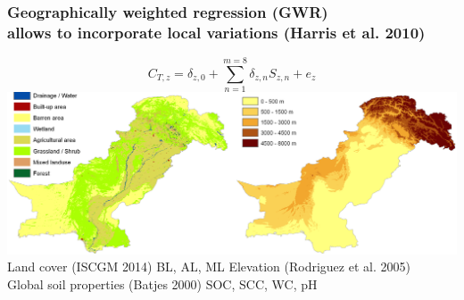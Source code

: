 \documentclass[10pt, compress]{beamer}
\begin{document}
\begin{frame}[fragile]
  \frametitle{Geographically weighted regression (GWR) \protect\\ allows to incorporate local variations \small (Harris et al. 2010)}

  \begin{equation*}
    C_{T,z} = \delta_{z,0} + \sum_{n=1}^{m=8}\delta_{z,n}S_{z,n} + e_z
    \end{equation*}
    \pause
    \includegraphics[width=1\textwidth]{images/Spatial_predictors.png} \\
  \alert{Land cover \small{(ISCGM 2014)}} BL, AL, ML \hspace{6pt} \alert{Elevation \small{(Rodriguez et al. 2005)}} \\
  \pause
  \alert{Global soil properties \small{(Batjes 2000)}} SOC, SCC, WC, pH
  
\end{frame}
\end{document}
